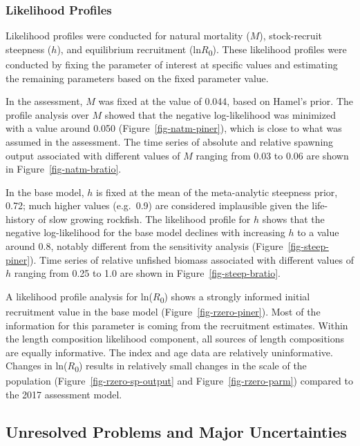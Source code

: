 \documentclass[
  english,
]{article}
\begin{document}
\subsubsection{Likelihood Profiles}\label{likelihood-profiles}

Likelihood profiles were conducted for natural mortality (\(M\)),
stock-recruit steepness (\(h\)), and equilibrium recruitment
(ln\(R\)\textsubscript{0}). These likelihood profiles were conducted by
fixing the parameter of interest at specific values and estimating the
remaining parameters based on the fixed parameter value.

In the assessment, \(M\) was fixed at the value of 0.044, based on
Hamel's prior. The profile analysis over \(M\) showed that the negative
log-likelihood was minimized with a value around 0.050
(Figure~\ref{fig-natm-piner}), which is close to what was assumed in the
assessment. The time series of absolute and relative spawning output
associated with different values of \(M\) ranging from 0.03 to 0.06 are
shown in Figure~\ref{fig-natm-bratio}.

In the base model, \(h\) is fixed at the mean of the meta-analytic
steepness prior, 0.72; much higher values (e.g.~0.9) are considered
implausible given the life-history of slow growing rockfish. The
likelihood profile for \(h\) shows that the negative log-likelihood for
the base model declines with increasing \(h\) to a value around 0.8,
notably different from the sensitivity analysis
(Figure~\ref{fig-steep-piner}). Time series of relative unfished biomass
associated with different values of \(h\) ranging from 0.25 to 1.0 are
shown in Figure~\ref{fig-steep-bratio}.

A likelihood profile analysis for ln(\(R\)\textsubscript{0}) shows a
strongly informed initial recruitment value in the base model
(Figure~\ref{fig-rzero-piner}). Most of the information for this
parameter is coming from the recruitment estimates. Within the length
composition likelihood component, all sources of length compositions are
equally informative. The index and age data are relatively
uninformative. Changes in ln(\(R\)\textsubscript{0}) results in
relatively small changes in the scale of the population
(Figure~\ref{fig-rzero-sp-output} and Figure~\ref{fig-rzero-parm})
compared to the 2017 assessment model.

\subsection{Unresolved Problems and Major
Uncertainties}\label{unresolved-problems-and-major-uncertainties}
\end{document}

